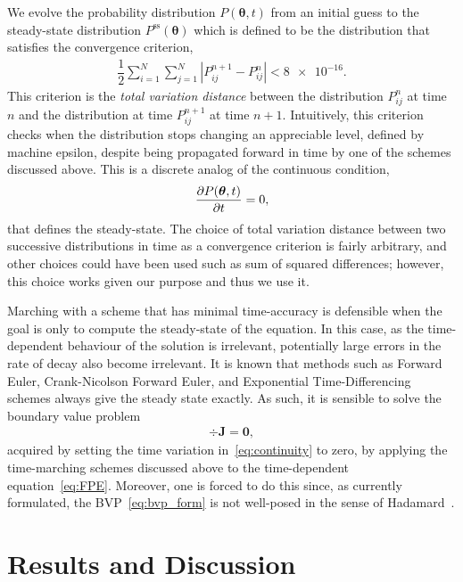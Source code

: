 \documentclass[11pt]{article}
\begin{document}
We evolve the probability distribution $P(\bm{\theta},t)$ from an initial guess to the steady-state distribution $P^{\mathrm{ss}}(\bm{\theta})$ which is defined to be the distribution that satisfies the convergence criterion,
\begin{align}
    \dfrac{1}{2}\sum\limits_{i=1}^{N}\sum\limits_{j=1}^{N}\left|P_{ij}^{n+1}-P_{ij}^{n}\right| < \num{8e-16}.\label{eq:converge_crit}
\end{align}
This criterion is the \emph{total variation distance} between the distribution $P_{ij}^{n}$ at time $n$ and the distribution at time $P_{ij}^{n+1}$ at time $n+1$. Intuitively, this criterion checks when the distribution stops changing an appreciable level, defined by machine epsilon, despite being propagated forward in time by one of the schemes discussed above. This is a discrete analog of the continuous condition,
\begin{align}
    \pdv{P(\bm{\theta},t)}{t} = 0,
\end{align}
that defines the steady-state. The choice of total variation distance between two successive distributions in time as a convergence criterion is fairly arbitrary, and other choices could have been used such as sum of squared differences; however, this choice works given our purpose and thus we use it.

Marching with a scheme that has minimal time-accuracy is defensible when the goal is only to compute the steady-state of the equation. In this case, as the time-dependent behaviour of the solution is irrelevant, potentially large errors in the rate of decay also become irrelevant. It is known that methods such as Forward Euler, Crank-Nicolson Forward Euler, and Exponential Time-Differencing schemes always give the steady state exactly. As such, it is sensible to solve the boundary value problem 
\begin{align}
    \div{\bm{J}} = \bm{0},\label{eq:bvp_form}
\end{align}
acquired by setting the time variation in~\eqref{eq:continuity} to zero, by applying the time-marching schemes discussed above to the time-dependent equation~\eqref{eq:FPE}. Moreover, one is forced to do this since, as currently formulated, the BVP~\eqref{eq:bvp_form} is not well-posed in the sense of Hadamard~\cite{hadamard1902}. 

\section{Results and Discussion}
\end{document}
